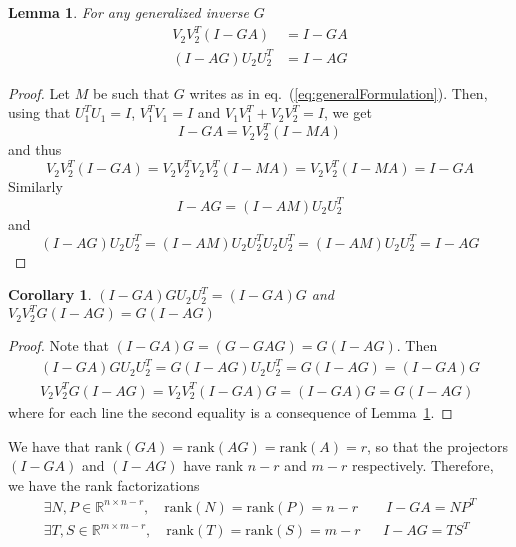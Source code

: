 \documentclass[]{article}
\newtheorem{corollary}[theorem]{Corollary}
\newtheorem{lemma}[theorem]{Lemma}
\theoremstyle{definition}
\begin{document}
\begin{lemma}
\label{lemma:projection}
For any generalized inverse $G$
	\begin{align*}
	V_2 V_2^T (I-GA) &= I-GA\\
	(I-AG)U_2U_2^T &= I-AG
	\end{align*}
\end{lemma}
\begin{proof}
Let $M$ be such that $G$ writes as in eq.~(\ref{eq:generalFormulation}). Then, using that $U_1^T U_1 = I$, $V_1^T V_1 = I$ and $V_1 V_1^T + V_2 V_2^T = I$, we get
\begin{equation*}
  I-GA = V_2 V_2^T (I-MA)
\end{equation*}
and thus
\begin{equation*}
  V_2 V_2^T (I-GA) = V_2 V_2^T V_2 V_2^T (I-MA) = V_2 V_2^T (I-MA) = I - GA
\end{equation*}
Similarly
\begin{equation*}
  I-AG = (I-AM)U_2 U_2^T
\end{equation*}
and
\begin{equation*}
  (I-AG)U_2 U_2^T = (I-AM)U_2 U_2^T U_2 U_2^T = (I-AM)U_2 U_2^T  = I-AG
\end{equation*}
\end{proof}

\begin{corollary}
\label{co:projection}
$(I-GA)G U_2 U_2^T = (I-GA)G$ and $V_2 V_2^T G(I-AG) = G(I-AG)$
\end{corollary}
\begin{proof}
Note that $(I-GA)G = (G - GAG) = G(I-AG)$. Then
\begin{align*}
  (I-GA)G U_2 U_2^T = G(I-AG) U_2 U_2^T = G(I-AG) = (I-GA)G \\
	V_2 V_2^T G(I-AG) = V_2 V_2^T (I-GA)G = (I-GA)G = G(I-AG)
\end{align*}
where for each line the second equality is a consequence of Lemma~\ref{lemma:projection}.
\end{proof}

We have that $\mathrm{rank}(GA) = \mathrm{rank}(AG) =  \mathrm{rank}(A) =  r$, so that the projectors $(I-GA)$ and $(I-AG)$ have rank $n-r$ and $m-r$ respectively.
Therefore, we have the rank factorizations
\begin{align*}
 \exists N,P\in \mathbb{R}^{n \times n-r}, \quad \mathrm{rank}(N) = \mathrm{rank}(P) = n-r &&\ I-GA = N P^T\\
  \exists T,S\in \mathbb{R}^{m \times m-r}, \quad \mathrm{rank}(T) = \mathrm{rank}(S) = m-r && I-AG = T S^T
\end{align*}
\end{document}
